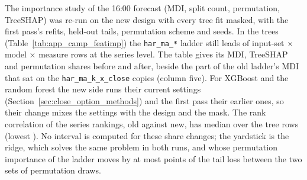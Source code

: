 The importance study of the 16:00 forecast (MDI, split count, permutation, TreeSHAP) was
re-run on the new design with every tree fit masked, with the
first pass's refits, held-out tails, permutation scheme and seeds. In the trees
(Table~\ref{tab:app_camp_featimp}) the \texttt{har\_ma\_*} ladder still leads
\campFILead{} of \campFILeadN{} input-set $\times$ model $\times$ measure rows at the series
level. The table gives its MDI, TreeSHAP and permutation shares before and after, beside
the part of the old ladder's MDI that sat on the \texttt{har\_ma\_k\_x\_close} copies
(column five). %
For XGBoost and the random forest the new side runs their current settings
(Section~\ref{sec:close_option_methods}) and the first pass their earlier ones, so their
change mixes the settings with the design and the mask.
The rank correlation of the series rankings, old against new, has median
\campFISpearmanTrees{} over the tree rows (lowest \campFISpearmanTreesMin{}). No interval is
computed for these share changes; the yardstick is the ridge, which solves the same problem
in both runs, and whose permutation importance of the ladder moves by at most
\campFIRidgeNoise{} points of the tail loss between the two sets of permutation draws.


